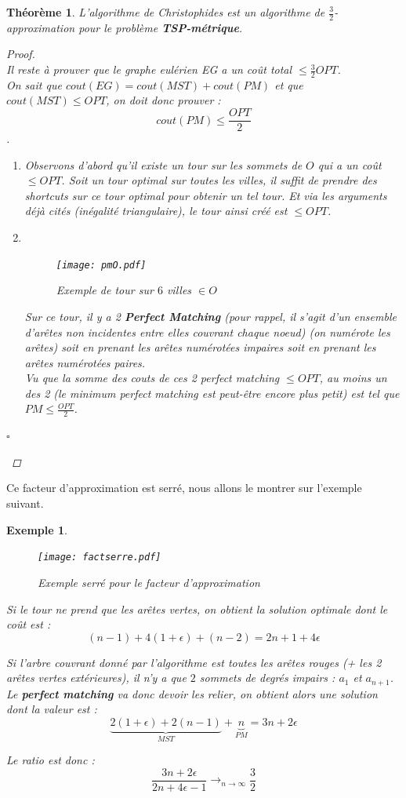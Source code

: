 \documentclass[12pt]{article}
\newcommand{\titre}[1]{\textcolor{title}{#1}}
\newcommand{\cqfd}{\begin{flushright}$\square$\end{flushright}}
\newtheorem{exemple}{Exemple}[section]
\newtheorem{thm}{Th\'eor\`eme}[section]
\newtheorem{proof}{Preuve}[section]
\begin{document}
\begin{thm}L'algorithme de Christophides est un algorithme de $\frac 3 2$-approximation pour le problème \textbf{\titre{TSP}-métrique}.
\begin{proof}$ $\\
Il reste à prouver que le graphe eulérien EG a un coût total $\leq \frac 3 2 OPT$. \\
On sait que $cout(EG) = cout(MST) + cout(PM)$ et que $cout(MST)\leq OPT$, on doit donc prouver : $$cout(PM)\leq \frac{OPT}{2}$$.
\begin{enumerate}
\item[a)] Observons d'abord qu'il existe un tour sur les sommets de $O$ qui a un coût $\leq OPT$. Soit un tour optimal sur toutes les
villes, il suffit de prendre des shortcuts sur ce tour optimal pour obtenir un tel tour. Et via les arguments déjà cités (inégalité
triangulaire), le tour ainsi créé est $\leq OPT$.
\item[b)]$ $
\begin{figure}[H]
    \begin{center}
    \texttt{[image: pmO.pdf]}
    \caption{Exemple de tour sur $6$ villes $\in O$}
    \end{center}
\end{figure}
Sur ce tour, il y a 2 \textbf{Perfect Matching} (pour rappel, il s'agit d'un ensemble d'arêtes non incidentes entre elles
couvrant chaque noeud) (on numérote les arêtes) soit en prenant les arêtes numérotées impaires soit en prenant les arêtes numérotées
paires.\\
Vu que la somme des couts de ces 2 perfect matching $\leq OPT$, au moins un des 2 (le minimum perfect matching est peut-être encore plus
petit) est tel que $PM \leq \frac{OPT}{2}$.
\end{enumerate}
\cqfd
\end{proof}
\end{thm}

Ce facteur d'approximation est serré, nous allons le montrer sur l'exemple suivant.

\begin{exemple}$ $\\
\begin{figure}[H]
    \begin{center}
    \texttt{[image: factserre.pdf]}
    \caption{Exemple serré pour le facteur d'approximation}
    \end{center}
\end{figure}

Si le tour ne prend que les arêtes vertes, on obtient la solution optimale dont le coût est :
$$(n-1) + 4(1+\epsilon) + (n-2) = 2n + 1 + 4\epsilon$$

Si l'arbre couvrant donné par l'algorithme est toutes les arêtes rouges (+ les 2 arêtes vertes extérieures), il n'y a que $2$
sommets de degrés impairs : $a_1$ et $a_{n+1}$. Le \textbf{perfect matching} va donc devoir les relier, on obtient alors une solution dont
la valeur est : $$ \underbrace{2(1+\epsilon) + 2(n-1)}_{MST} +      \underbrace{n}_{PM}       = 3n+2\epsilon $$

Le ratio est donc : $$\dfrac{3n+2\epsilon}{2n+4\epsilon-1} \to_{n\to\infty} \dfrac{3}{2}$$
\end{exemple}
\end{document}
